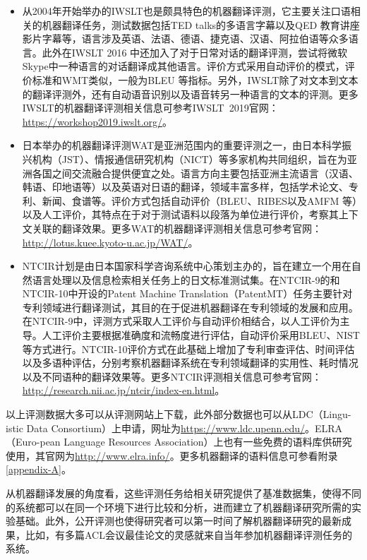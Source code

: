\begin{itemize}
\vspace{0.5em}
\item 从2004年开始举办的IWSLT也是颇具特色的机器翻译评测，它主要关注口语相关的机器翻译任务，测试数据包括TED talks的多语言字幕以及QED 教育讲座影片字幕等，语言涉及英语、法语、德语、捷克语、汉语、阿拉伯语等众多语言。此外在IWSLT 2016 中还加入了对于日常对话的翻译评测，尝试将微软Skype中一种语言的对话翻译成其他语言。评价方式采用自动评价的模式，评价标准和WMT类似，一般为BLEU 等指标。另外，IWSLT除了对文本到文本的翻译评测外，还有自动语音识别以及语音转另一种语言的文本的评测。更多IWSLT的机器翻译评测相关信息可参考IWSLT\ 2019官网：\url{https://workshop2019.iwslt.org/}。
\vspace{0.5em}
\item 日本举办的机器翻译评测WAT是亚洲范围内的重要评测之一，由日本科学振兴机构（JST）、情报通信研究机构（NICT）等多家机构共同组织，旨在为亚洲各国之间交流融合提供便宜之处。语言方向主要包括亚洲主流语言（汉语、韩语、印地语等）以及英语对日语的翻译，领域丰富多样，包括学术论文、专利、新闻、食谱等。评价方式包括自动评价（BLEU、RIBES以及AMFM 等）以及人工评价，其特点在于对于测试语料以段落为单位进行评价，考察其上下文关联的翻译效果。更多WAT的机器翻译评测相关信息可参考官网：\url{http://lotus.kuee.kyoto-u.ac.jp/WAT/}。
\vspace{0.5em}
\item NTCIR计划是由日本国家科学咨询系统中心策划主办的，旨在建立一个用在自然语言处理以及信息检索相关任务上的日文标准测试集。在NTCIR-9的和NTCIR-10中开设的Patent Machine Translation（PatentMT）任务主要针对专利领域进行翻译测试，其目的在于促进机器翻译在专利领域的发展和应用。在NTCIR-9中，评测方式采取人工评价与自动评价相结合，以人工评价为主导。人工评价主要根据准确度和流畅度进行评估，自动评价采用BLEU、NIST等方式进行。NTCIR-10评价方式在此基础上增加了专利审查评估、时间评估以及多语种评估，分别考察机器翻译系统在专利领域翻译的实用性、耗时情况以及不同语种的翻译效果等。更多NTCIR评测相关信息可参考官网：\url{http://research.nii.ac.jp/ntcir/index-en.html}。
\vspace{0.5em}
\end{itemize}

\parinterval 以上评测数据大多可以从评测网站上下载，此外部分数据也可以从LDC（Lingu-istic Data Consortium）上申请，网址为\url{https://www.ldc.upenn.edu/}。ELRA（Euro-pean Language Resources Association）上也有一些免费的语料库供研究使用，其官网为\url{http://www.elra.info/}。更多机器翻译的语料信息可参看附录\ref{appendix-A}。

\parinterval 从机器翻译发展的角度看，这些评测任务给相关研究提供了基准数据集，使得不同的系统都可以在同一个环境下进行比较和分析，进而建立了机器翻译研究所需的实验基础。此外，公开评测也使得研究者可以第一时间了解机器翻译研究的最新成果，比如，有多篇ACL会议最佳论文的灵感就来自当年参加机器翻译评测任务的系统。

